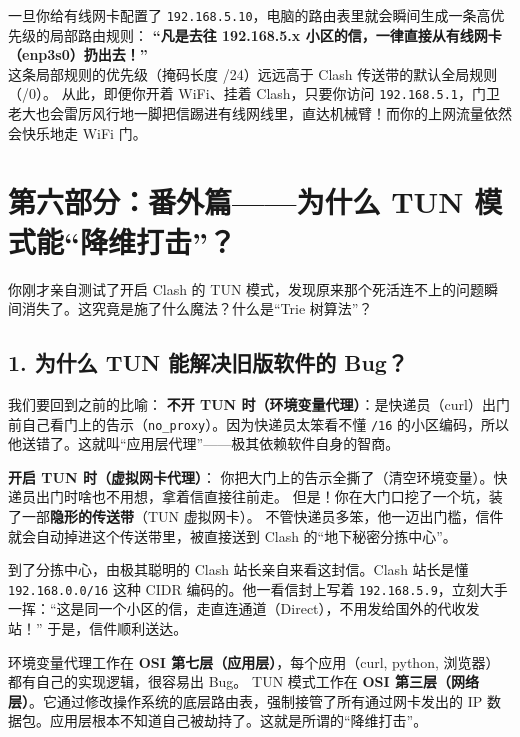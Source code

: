 \documentclass[12pt,a4paper]{ctexart}
\begin{document}
\begin{tcolorbox}[colback=green!5,colframe=green!75!black,title=为什么这样配就能解决？,fonttitle=\bfseries,boxrule=0.5pt,arc=3mm]
一旦你给有线网卡配置了 \texttt{192.168.5.10}，电脑的路由表里就会瞬间生成一条高优先级的局部路由规则：
\textbf{“凡是去往 192.168.5.x 小区的信，一律直接从有线网卡（enp3s0）扔出去！”} \\
这条局部规则的优先级（掩码长度 /24）远远高于 Clash 传送带的默认全局规则（/0）。
从此，即便你开着 WiFi、挂着 Clash，只要你访问 \texttt{192.168.5.1}，门卫老大也会雷厉风行地一脚把信踢进有线网线里，直达机械臂！而你的上网流量依然会快乐地走 WiFi 门。
\end{tcolorbox}

\newpage
\section{第六部分：番外篇——为什么 TUN 模式能“降维打击”？}

你刚才亲自测试了开启 Clash 的 TUN 模式，发现原来那个死活连不上的问题瞬间消失了。这究竟是施了什么魔法？什么是“Trie 树算法”？

\subsection{1. 为什么 TUN 能解决旧版软件的 Bug？}

我们要回到之前的比喻：
\textbf{不开 TUN 时（环境变量代理）}：是快递员（curl）出门前自己看门上的告示（\texttt{no\_proxy}）。因为快递员太笨看不懂 \texttt{/16} 的小区编码，所以他送错了。这就叫“应用层代理”——极其依赖软件自身的智商。

\textbf{开启 TUN 时（虚拟网卡代理）}：
你把大门上的告示全撕了（清空环境变量）。快递员出门时啥也不用想，拿着信直接往前走。
但是！你在大门口挖了一个坑，装了一部\textbf{隐形的传送带}（TUN 虚拟网卡）。
不管快递员多笨，他一迈出门槛，信件就会自动掉进这个传送带里，被直接送到 Clash 的“地下秘密分拣中心”。

到了分拣中心，由极其聪明的 Clash 站长亲自来看这封信。Clash 站长是懂 \texttt{192.168.0.0/16} 这种 CIDR 编码的。他一看信封上写着 \texttt{192.168.5.9}，立刻大手一挥：“这是同一个小区的信，走直连通道（Direct），不用发给国外的代收发站！”
于是，信件顺利送达。

\begin{tcolorbox}[colback=purple!5,colframe=purple!75!black,title=硬核知识：OSI 模型的降维打击,fonttitle=\bfseries,boxrule=0.5pt,arc=3mm]
环境变量代理工作在 \textbf{OSI 第七层（应用层）}，每个应用（curl, python, 浏览器）都有自己的实现逻辑，很容易出 Bug。
TUN 模式工作在 \textbf{OSI 第三层（网络层）}。它通过修改操作系统的底层路由表，强制接管了所有通过网卡发出的 IP 数据包。应用层根本不知道自己被劫持了。这就是所谓的“降维打击”。
\end{tcolorbox}
\end{document}
